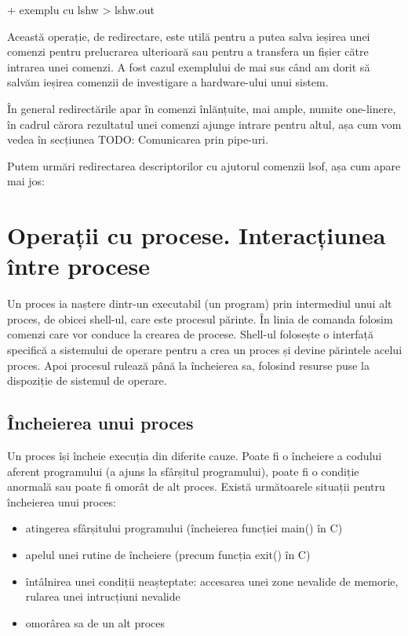 + exemplu cu lshw > lshw.out

Această operație, de redirectare, este utilă pentru a putea salva ieșirea unei
comenzi pentru prelucrarea ulterioară sau pentru a transfera un fișier către
intrarea unei comenzi. A fost cazul exemplului de mai sus când am dorit să
salvăm ieșirea comenzii de investigare a hardware-ului unui sistem.

În general redirectările apar în comenzi înlănțuite, mai ample, numite
one-linere, în cadrul cărora rezultatul unei comenzi ajunge intrare pentru
altul, așa cum vom vedea în secțiunea TODO: Comunicarea prin pipe-uri.

Putem urmări redirectarea descriptorilor cu ajutorul comenzii lsof, așa cum apare mai jos:

\section{Operații cu procese. Interacțiunea între procese}

Un proces ia naștere dintr-un executabil (un program) prin intermediul unui alt
proces, de obicei shell-ul, care este procesul părinte. În linia de comanda
folosim comenzi care vor conduce la crearea de procese. Shell-ul folosește o
interfață specifică a sistemului de operare pentru a crea un proces și devine
părintele acelui proces. Apoi procesul rulează până la încheierea sa, folosind
resurse puse la dispoziție de sistemul de operare.

\subsection{Încheierea unui proces}

Un proces își încheie execuția din diferite cauze. Poate fi o încheiere a
codului aferent programului (a ajuns la sfârșitul programului), poate fi o
condiție anormală sau poate fi omorât de alt proces. Există următoarele situații
pentru încheierea unui proces:

\begin{itemize}
	\item atingerea sfârșitului programului (încheierea funcției main() în C)
	\item apelul unei rutine de încheiere (precum funcția exit() în C)
	\item întâlnirea unei condiții neașteptate: accesarea unei zone nevalide
		de memorie, rularea unei intrucțiuni nevalide
	\item omorârea sa de un alt proces
\end{itemize}

